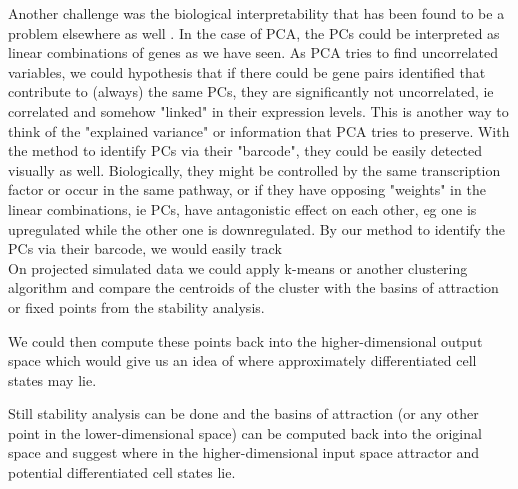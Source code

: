 \documentclass[journal, a4paper]{IEEEtran}
\begin{document}
Another challenge was the biological interpretability that has been found to be a problem elsewhere as well \cite{interpretability}. In the case of PCA, the PCs could be interpreted as linear combinations of genes as we have seen. As PCA tries to find uncorrelated variables, we could hypothesis that if there could be gene pairs identified that contribute to (always) the same PCs, they are significantly not uncorrelated, ie correlated and somehow "linked" in their expression levels. This is another way to think of the "explained variance" or information that PCA tries to preserve. With the method to identify PCs via their "barcode", they could be easily detected visually as well. Biologically, they might be controlled by the same transcription factor or occur in the same pathway, or if they have opposing "weights" in the linear combinations, ie PCs, have antagonistic effect on each other, eg one is upregulated while the other one is downregulated. By our method to identify the PCs via their barcode, we would easily track \\



On projected simulated data we could apply k-means or another clustering algorithm and compare the centroids of the cluster with the basins of attraction or fixed points from the stability analysis. 

We could then compute these points back into the higher-dimensional output space which would give us an idea of where approximately differentiated cell states may lie.

Still stability analysis can be done and the basins of attraction (or any other point in the lower-dimensional space) can be computed back into the original space and suggest where in the higher-dimensional input space attractor and potential differentiated cell states lie. 

\end{document}
